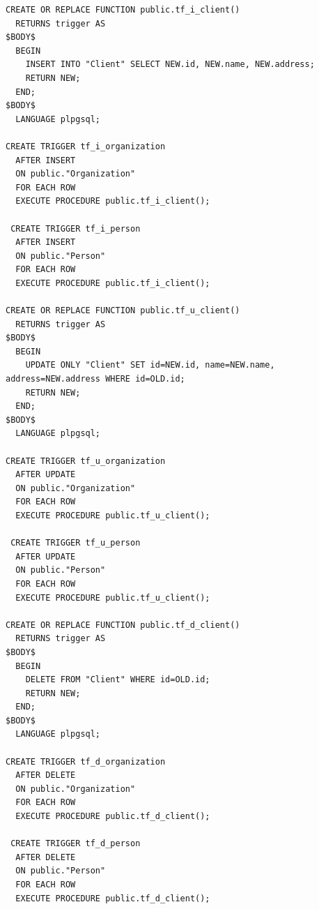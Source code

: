 \documentclass[11pt]{article}
\begin{document}
\begin{verbatim}
CREATE OR REPLACE FUNCTION public.tf_i_client()
  RETURNS trigger AS
$BODY$
  BEGIN
    INSERT INTO "Client" SELECT NEW.id, NEW.name, NEW.address;
    RETURN NEW;
  END;
$BODY$
  LANGUAGE plpgsql;

CREATE TRIGGER tf_i_organization
  AFTER INSERT
  ON public."Organization"
  FOR EACH ROW
  EXECUTE PROCEDURE public.tf_i_client();

 CREATE TRIGGER tf_i_person
  AFTER INSERT
  ON public."Person"
  FOR EACH ROW
  EXECUTE PROCEDURE public.tf_i_client();

CREATE OR REPLACE FUNCTION public.tf_u_client()
  RETURNS trigger AS
$BODY$
  BEGIN
    UPDATE ONLY "Client" SET id=NEW.id, name=NEW.name, address=NEW.address WHERE id=OLD.id;
    RETURN NEW;
  END;
$BODY$
  LANGUAGE plpgsql;

CREATE TRIGGER tf_u_organization
  AFTER UPDATE
  ON public."Organization"
  FOR EACH ROW
  EXECUTE PROCEDURE public.tf_u_client();

 CREATE TRIGGER tf_u_person
  AFTER UPDATE
  ON public."Person"
  FOR EACH ROW
  EXECUTE PROCEDURE public.tf_u_client();

CREATE OR REPLACE FUNCTION public.tf_d_client()
  RETURNS trigger AS
$BODY$
  BEGIN
    DELETE FROM "Client" WHERE id=OLD.id;
    RETURN NEW;
  END;
$BODY$
  LANGUAGE plpgsql;

CREATE TRIGGER tf_d_organization
  AFTER DELETE
  ON public."Organization"
  FOR EACH ROW
  EXECUTE PROCEDURE public.tf_d_client();

 CREATE TRIGGER tf_d_person
  AFTER DELETE
  ON public."Person"
  FOR EACH ROW
  EXECUTE PROCEDURE public.tf_d_client();
\end{verbatim}
\end{document}
